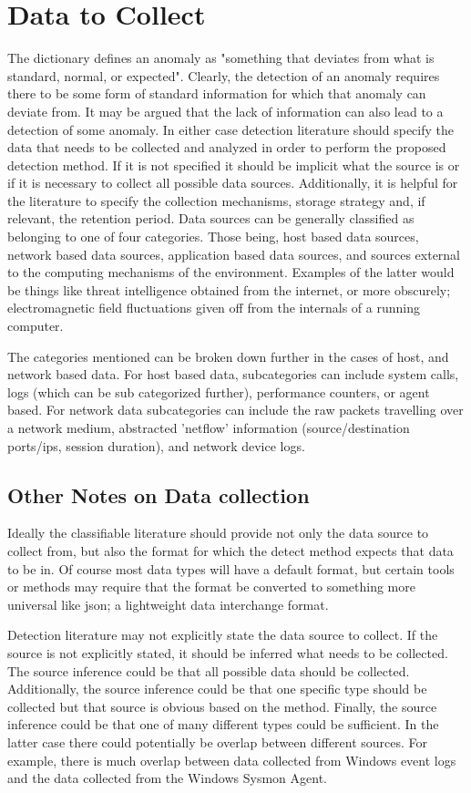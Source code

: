 \section{Data to Collect}
The dictionary defines an anomaly as "something that deviates from what is standard, normal, or expected". Clearly, the detection of an anomaly requires there to be some form of standard information for which that anomaly can deviate from. 
It may be argued that the lack of information can also lead to a detection of some anomaly. 
In either case detection literature should specify the data that needs to be collected and analyzed in order to perform the proposed detection method. 
If it is not specified it should be implicit what the source is or if it is necessary to collect all possible data sources. 
Additionally, it is helpful for the literature to specify the collection mechanisms, storage strategy and, if relevant, the retention period. 
Data sources can be generally classified as belonging to one of four categories. 
Those being, host based data sources, network based data sources, application based data sources, and sources external to the computing mechanisms of the environment. 
Examples of the latter would be things like threat intelligence obtained from the internet, or more obscurely; electromagnetic field fluctuations given off from the internals of a running computer.

The categories mentioned can be broken down further in the cases of host, and network based data. 
For host based data, subcategories can include system calls, logs (which can be sub categorized further), performance counters, or agent based. 
For network data subcategories can include the raw packets travelling over a network medium, abstracted 'netflow' information (source/destination ports/ips, session duration), and network device logs. 

\subsection{Other Notes on Data collection}
Ideally the classifiable literature should provide not only the data source to collect from, but also the format for which the detect method expects that data to be in. 
Of course most data types will have a default format, but certain tools or methods may require that the format be converted to something more universal like json; a lightweight data interchange format\cite{crockford2009introducing}.

Detection literature may not explicitly state the data source to collect. 
If the source is not explicitly stated, it should be inferred what needs to be collected. 
The source inference could be that all possible data should be collected. 
Additionally, the source inference could be that one specific type should be collected but that source is obvious based on the method. 
Finally, the source inference could be that one of many different types could be sufficient. 
In the latter case there could potentially be overlap between different sources. 
For example, there is much overlap between data collected from Windows event logs and the data collected from the Windows Sysmon Agent.

